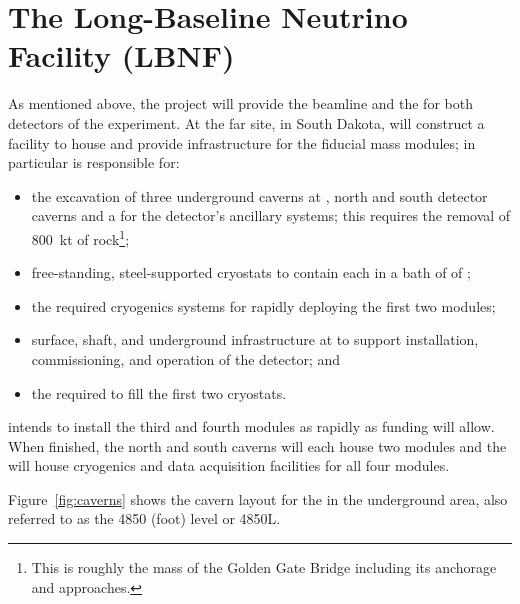 \section{The Long-Baseline Neutrino Facility (LBNF)} 
\label{sec:exec:lbnf}

As mentioned above, the  project will provide the beamline and the  for both detectors of the  experiment. At the far site,  in South Dakota,  will construct a facility to house and provide infrastructure for the   \nominalmodsize fiducial mass  modules; in particular  is responsible for:

\begin{itemize}

\item the excavation of three underground caverns at , north and south detector caverns and a  for the detector's ancillary systems; this requires the removal of \SI{800}{kt} of rock\footnote{This is roughly the mass of the Golden Gate Bridge including its anchorage and approaches.};

 \item free-standing, steel-supported cryostats to contain each  in a bath of \larmass of ;   
 \item the required cryogenics systems for rapidly deploying the first two modules;

\item surface, shaft, and underground infrastructure at   to support installation, commissioning, and operation of the detector; and

\item the  required to fill the first two cryostats.
\end{itemize}

 intends to install the third and fourth  modules as rapidly as funding will 
allow. When finished, the north and south caverns will each house two modules and the  will house cryogenics and data acquisition facilities for all four modules.

Figure~\ref{fig:caverns} shows the cavern layout for the  in the  underground area, also referred to as the 4850 (foot) level or 4850L.  


